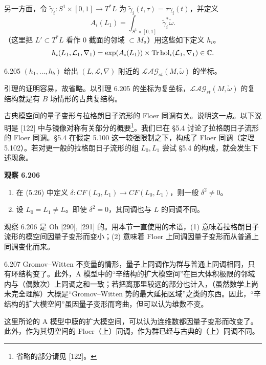 另一方面，令 $\tilde\gamma_i:S^1\times[0,1]\to T^*L$ 为 $\tilde\gamma_i(t,\tau)=\tau\gamma_i(t)$，并定义
\[
  A_i(L_1)=\int_{S^1\times[0,1]}\tilde\gamma_i^*\check\omega.
\]
（这里把 $L'\subset T^*L$ 看作 $0$ 截面的邻域 $\subset M$。）用这些如下定义 $h_i$。
\[
  h_i(L_1,\mathcal L_1,\nabla_1)=\exp(A_i(L_1))\times\mathrm{Tr}\,\mathrm{hol}_i(\mathcal L_1,\nabla_1)\in\mathbb{C}.
\]

\begin{lemma}{6.205}
  $(h_1,\dots,h_b)$ 给出 $(L,\mathcal L,\nabla)$ 附近的 $\mathcal{LAG}_{st}(M,\check\omega)$ 的坐标。
\end{lemma}

引理的证明容易，故省略。以引理 6.205 的坐标为复坐标，$\mathcal{LAG}_{st}(M,\check\omega)$ 的复结构就是有 $B$ 场情形的古典复结构。

古典模空间的量子变形与拉格朗日子流形的 Floer 同调有关。说明这一点。以下说明是 [122] 中与镜像对称有关部分的概要\footnote{省略的部分请见 [122]。}。我们已在 §5.4 讨论了拉格朗日子流形的 Floer 同调。§5.4 在假定 5.100 这一较强限制之下，构成了 Floer 同调（定理 5.102）。若对更一般的拉格朗日子流形的组 $L_0,L_1$ 尝试 §5.4 的构成，就会发生下述现象。

\textbf{观察 6.206}
\begin{enumerate}[label=（\arabic*）]
  \item 在 (5.26) 中定义 $\delta:CF(L_0,L_1)\to CF(L_0,L_1)$，则一般 $\delta^2\neq0$。
  \item 设 $L_0=L_1\neq L$。即使 $\delta^2=0$，其同调也与 $L$ 的同调不同。
\end{enumerate}

观察 6.206 是 Oh [290], [291] 的。用本节一直使用的术语，(1) 意味着拉格朗日子流形的模空间因量子变形而变小；(2) 意味着 Floer 上同调因量子变形而从普通上同调变化而来。

\begin{remark}{6.207}
  Gromov–Witten 不变量的情形，量子上同调作为群与普通上同调相同，只有环结构变了。此外，A 模型中的“辛结构的扩大模空间”在巨大体积极限的邻域内与（偶数次）上同调之和一致；若把离那里较远的部分也计入，（虽然数学上尚未完全理解）大概是“Gromov–Witten 势的最大延拓区域”之类的东西。因此，“辛结构的扩大模空间”虽因量子变形而弯曲，但可以认为维数不变。
\end{remark}

这里所论的 A 模型中膜的扩大模空间，可以认为连维数都因量子变形而改变了。此外，作为其切空间的 Floer（上）同调，作为群已经与古典的（上）同调不同。

